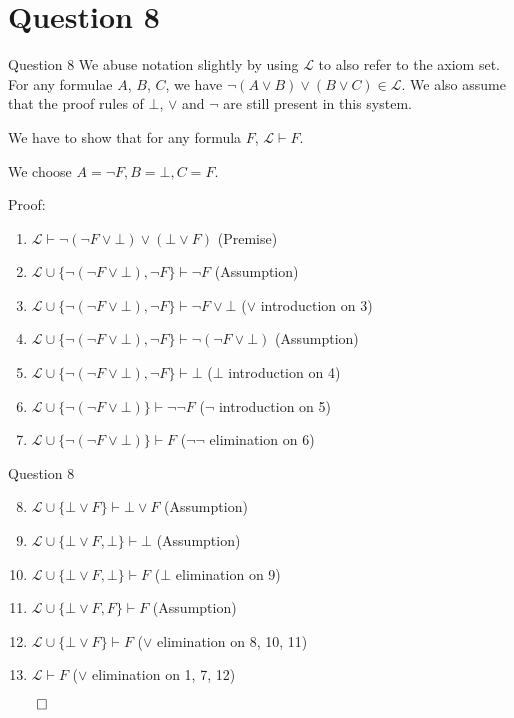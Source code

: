 \documentclass{beamer}
\begin{document}
    \section{Question 8}
    {
        \begin{frame}{Question 8}
            We abuse notation slightly by using $\mathcal{L}$ to also refer to the axiom set. For any formulae $A$, $B$, $C$, we have $\neg \left(A \lor B\right) \lor (B \lor C) \in \mathcal{L}$. We also assume that the proof rules of $\bot$, $\lor$ and $\neg$ are still present in this system.

            We have to show that for any formula $F$, $\mathcal{L} \vdash F$.

            We choose $A = \neg F, B = \bot, C = F$.

            Proof:
            \begin{enumerate}
                \item $\mathcal{L} \vdash \neg (\neg F \lor \bot) \lor (\bot \lor F)$ (Premise)
                \item $\mathcal{L} \cup \{\neg (\neg F \lor \bot), \neg F\} \vdash \neg F$ (Assumption)
                \item $\mathcal{L} \cup \{\neg (\neg F \lor \bot), \neg F\} \vdash \neg F \lor \bot$ ($\lor$ introduction on 3)
                \item $\mathcal{L} \cup \{\neg (\neg F \lor \bot), \neg F\} \vdash \neg (\neg F \lor \bot)$ (Assumption)
                \item $\mathcal{L} \cup \{\neg (\neg F \lor \bot), \neg F\} \vdash \bot$ ($\bot$ introduction on 4)
                \item $\mathcal{L} \cup \{\neg (\neg F \lor \bot)\} \vdash \neg \neg F$ ($\neg$ introduction on 5)
                \item $\mathcal{L} \cup \{\neg (\neg F \lor \bot)\} \vdash F$ ($\neg \neg$ elimination on 6)
            \end{enumerate}
        \end{frame}
        \begin{frame}{Question 8}
            \begin{enumerate}
                \setcounter{enumi}{7}
                \item $\mathcal{L} \cup \{\bot \lor F\} \vdash \bot \lor F$ (Assumption)
                \item $\mathcal{L} \cup \{\bot \lor F, \bot\} \vdash \bot$ (Assumption)
                \item $\mathcal{L} \cup \{\bot \lor F, \bot \} \vdash F$ ($\bot$ elimination on 9)
                \item $\mathcal{L} \cup \{\bot \lor F, F\} \vdash F$ (Assumption)
                \item $\mathcal{L} \cup \{\bot \lor F\} \vdash F$ ($\lor$ elimination on 8, 10, 11)
                \item $\mathcal{L} \vdash F$ ($\lor$ elimination on 1, 7, 12)
            \end{enumerate}
            $\qed$
        \end{frame}
    }
\end{document}
